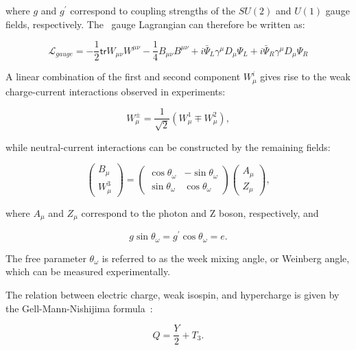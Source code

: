 where $g$ and $g^{\prime}$ correspond to coupling strengths of the $SU(2)$ and $U(1)$ gauge fields, respectively. The \ew~gauge Lagrangian can therefore be written as:

\begin{equation}
\label{eq:LagGauge}
\mathcal{L}_{gauge}=-\frac{1}{2}\textsf{tr}W_{\mu\nu}W^{\mu\nu}-\frac{1}{4}B_{\mu\nu}B^{\mu\nu}+i\bar{\Psi}_{L}\gamma^{\mu}D_{\mu}\Psi_{L}+i\bar{\Psi}_{R}\gamma^{\mu}D_{\mu}\Psi_{R}
\end{equation}

A linear combination of the first and second component $W_{\mu}^{i}$ gives rise to the weak charge-current interactions observed in experiments:

\begin{equation}
\label{eq:CC}
W^{\pm}_{\mu}=\frac{1}{\sqrt{2}}(W^{1}_{\mu}\mp W^{2}_{\mu}),
\end{equation}

while neutral-current interactions can be constructed by the remaining fields:

\begin{equation}
\label{eq:NC}
\begin{pmatrix}B_{\mu}\\W_{\mu}^{3}\end{pmatrix}=\begin{pmatrix}\cos\theta_{\omega}&-\sin\theta_{\omega}\\\sin\theta_{\omega}&\cos\theta_{\omega}\end{pmatrix}\begin{pmatrix}A_{\mu}\\Z_{\mu}\end{pmatrix},
\end{equation}

where $A_{\mu}$ and $Z_{\mu}$ correspond to the photon and Z boson, respectively, and 

\begin{equation}
\label{eq:MixAngle}
g\sin\theta_{\omega}=g^{\prime}\cos\theta_{\omega}=e.
\end{equation}

The free parameter $\theta_{\omega}$ is referred to as the week mixing angle, or Weinberg angle, which can be measured experimentally.

The relation between electric charge, weak isospin, and hypercharge is given by the Gell-Mann-Nishijima formula~\cite{Nakano:1953zz,Gell-Mann:1956iqa}:

\begin{equation}
Q=\frac{Y}{2}+T_{3}.
\end{equation}

